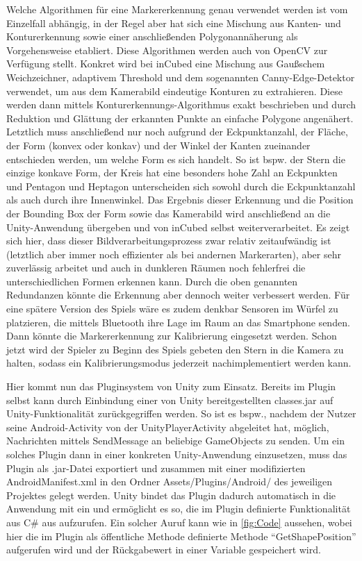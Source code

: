 Welche Algorithmen für eine Markererkennung genau verwendet werden ist vom Einzelfall abhängig, in der Regel aber hat sich eine Mischung aus Kanten- und Konturerkennung sowie einer anschließenden Polygonannäherung als Vorgehensweise etabliert. Diese Algorithmen werden auch von OpenCV zur Verfügung stellt. Konkret wird bei inCubed eine Mischung aus Gaußschem Weichzeichner, adaptivem Threshold und dem sogenannten Canny-Edge-Detektor verwendet, um aus dem Kamerabild eindeutige Konturen zu extrahieren. Diese werden dann mittels Konturerkennungs-Algorithmus exakt beschrieben und durch Reduktion und Glättung der erkannten Punkte an einfache Polygone angenähert. Letztlich muss anschließend nur noch aufgrund der Eckpunktanzahl, der Fläche, der Form (konvex oder konkav) und der Winkel der Kanten zueinander entschieden werden, um welche Form es sich handelt. So ist bspw. der Stern die einzige konkave Form, der Kreis hat eine besonders hohe Zahl an Eckpunkten und Pentagon und Heptagon unterscheiden sich sowohl durch die Eckpunktanzahl als auch durch ihre Innenwinkel. Das Ergebnis dieser Erkennung und die Position der Bounding Box der Form sowie das Kamerabild wird anschließend an die Unity-Anwendung übergeben und von inCubed selbst weiterverarbeitet. Es zeigt sich hier, dass dieser Bildverarbeitungsprozess zwar relativ zeitaufwändig ist (letztlich aber immer noch effizienter als bei andernen Markerarten), aber sehr zuverlässig arbeitet und auch in dunkleren Räumen noch fehlerfrei die unterschiedlichen Formen erkennen kann. Durch die oben genannten Redundanzen könnte die Erkennung aber dennoch weiter verbessert werden. Für eine spätere Version des Spiels wäre es zudem denkbar Sensoren im Würfel zu platzieren, die mittels Bluetooth ihre Lage im Raum an das Smartphone senden. Dann könnte die Markererkennung zur Kalibrierung eingesetzt werden. Schon jetzt wird der Spieler zu Beginn des Spiels gebeten den Stern in die Kamera zu halten, sodass ein Kalibrierungsmodus jederzeit nachimplementiert werden kann.

Hier kommt nun das Pluginsystem von Unity zum Einsatz. Bereits im Plugin selbst kann durch Einbindung einer von Unity bereitgestellten classes.jar auf Unity-Funktionalität zurückgegriffen werden. So ist es bspw., nachdem der Nutzer seine Android-Activity von der UnityPlayerActivity abgeleitet hat, möglich, Nachrichten mittels SendMessage an beliebige GameObjects zu senden. Um ein solches Plugin dann in einer konkreten Unity-Anwendung einzusetzen, muss das Plugin als .jar-Datei exportiert und zusammen mit einer modifizierten AndroidManifest.xml in den Ordner Assets/Plugins/Android/ des jeweiligen Projektes gelegt werden. Unity bindet das Plugin dadurch automatisch in die Anwendung mit ein und ermöglicht es so, die im Plugin definierte Funktionalität aus C\# aus aufzurufen. Ein solcher Auruf kann wie in \ref{fig:Code} aussehen, wobei hier die im Plugin als öffentliche Methode definierte Methode \enquote{GetShapePosition} aufgerufen wird und der Rückgabewert in einer Variable gespeichert wird.

